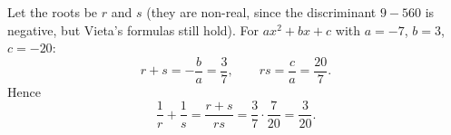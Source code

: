 Let the roots be $r$ and $s$ (they are non-real, since the discriminant $9-560$ is negative, but Vieta's formulas still hold). For $ax^2+bx+c$ with $a=-7$, $b=3$, $c=-20$:
\[r+s=-\dfrac {b}{a}=\dfrac{3}{7},\qquad rs=\dfrac {c}{a}=\dfrac{20}{7}.\]
Hence
\[\dfrac{1}{r}+\dfrac{1}{s}=\dfrac{r+s}{rs}=\dfrac{3}{7}\cdot\dfrac{7}{20}=\boxed{\dfrac{3}{20}}.\]

